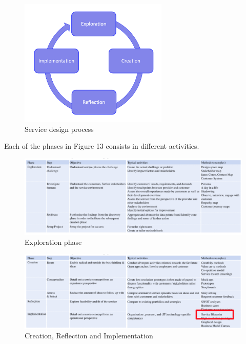 \documentclass[10pt,a4paper]{article}
\begin{document}
\pagebreak
\begin{figure}[ht!]
 \hfill \includegraphics[width=200pt]{images/service-design-process}\hspace*{\fill}
 \caption{Service design process}
  \label{fig:service-design-process}
\end{figure}
Each of the phases in Figure 13 consists in different activities.
\begin{figure}[ht!]
 \hfill \includegraphics[width=410pt]{images/exploration}\hspace*{\fill}
 \caption{Exploration phase}
  \label{fig:exploration}
\end{figure}
\begin{figure}[ht!]
 \hfill \includegraphics[width=410pt]{images/other-phases}\hspace*{\fill}
 \caption{Creation, Reflection and Implementation}
  \label{fig:other-phases}
\end{figure}
\end{document}
